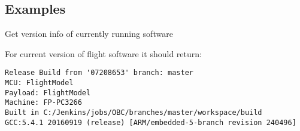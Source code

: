 \subsection{Examples}
Get version info of currently running \obc software


For current version of flight software it should return:
\begin{verbatim}
Release Build from '07208653' branch: master
MCU: FlightModel
Payload: FlightModel
Machine: FP-PC3266
Built in C:/Jenkins/jobs/OBC/branches/master/workspace/build
GCC:5.4.1 20160919 (release) [ARM/embedded-5-branch revision 240496] 
\end{verbatim}

